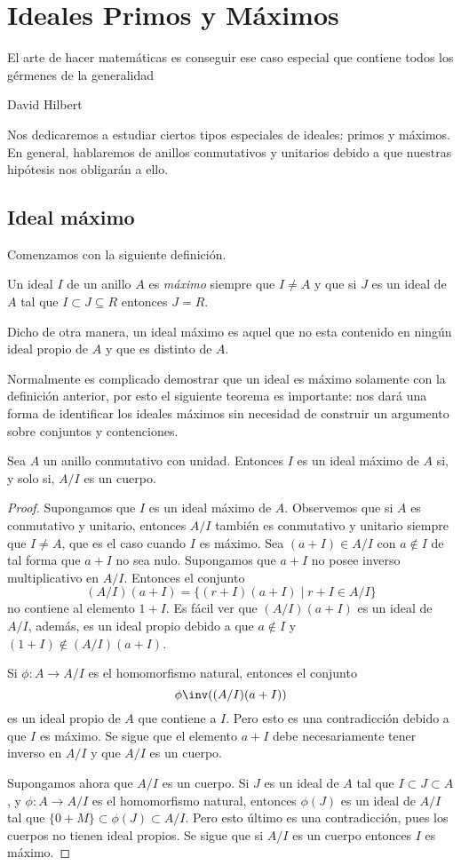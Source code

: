 %
\chapter{Ideales Primos y Máximos} 
\epigraph{El arte de hacer matemáticas es conseguir ese caso especial que contiene todos los gérmenes de la generalidad}{David Hilbert}

\noindent Nos dedicaremos a estudiar ciertos tipos especiales de ideales: primos y máximos. En general, hablaremos de anillos conmutativos y unitarios debido a que nuestras hipótesis nos obligarán a ello. 
\section{Ideal máximo}
\noindent Comenzamos con la siguiente definición.
\begin{defi}
	Un ideal $I$ de un anillo $A$ es \textit{máximo} siempre que $I\neq A$ y que si $J$ es un ideal de $A$ tal que $I\subset J\subseteq R$ entonces $J=R$.
\end{defi}
Dicho de otra manera, un ideal máximo es aquel que no esta contenido en ningún ideal propio de $A$ y que es distinto de $A$. 

Normalmente es complicado demostrar que un ideal es máximo solamente con la definición anterior, por esto el siguiente teorema es importante: nos dará una forma de identificar los ideales máximos sin necesidad de construir un argumento sobre conjuntos y contenciones.

\begin{teo}
	Sea $A$ un anillo conmutativo con unidad. Entonces $I$ es un ideal máximo de $A$ si, y solo si, $A/I$ es un cuerpo.
\end{teo}
\begin{proof}
	Supongamos que $I$ es un ideal máximo de $A$. Observemos que si $A$ es conmutativo y unitario, entonces $A/I$ también es conmutativo y unitario siempre que $I\neq A$, que es el caso cuando $I$ es  máximo. Sea $(a+I) \in A/I$ con $a\notin I$ de tal forma que $a+I$ no sea nulo. Supongamos que $a+I$ no posee inverso multiplicativo en $A/I$. Entonces el conjunto \[ (A/I)(a+I) = \{ (r+I)(a+I) \mid r+I\in A/I \} \] no  contiene al elemento $1+I$. Es fácil ver que $(A/I)(a+I)$ es un ideal de $A/I$, además, es un ideal propio debido a que $a\notin I$ y $(1+I)\notin (A/I)(a+I)$.
	
	Si $\phi\mathpunct{:}A\to A/I$ es el homomorfismo natural, entonces el conjunto \[ \phi\inv((A/I)(a+I)) \] es un ideal propio de $A$ que contiene a $I$. Pero esto es una contradicción debido a que $I$ es máximo. Se sigue que el elemento $a+I$ debe necesariamente tener inverso en $A/I$ y que $A/I$ es un cuerpo.
	
	Supongamos ahora que $A/I$ es un cuerpo. Si $J$ es un ideal de $A$ tal que $I\subset J\subset A$, y $\phi\mathpunct{:}A\to A/I$ es el homomorfismo natural, entonces $\phi(J)$ es un ideal de $A/I$ tal que $\{ 0+M \}\subset \phi(J)\subset A/I$. Pero esto último es una contradicción, pues los cuerpos no tienen ideal propios. Se sigue que si $A/I$ es un cuerpo entonces $I$ es máximo.
\end{proof}

